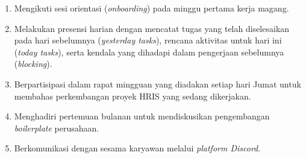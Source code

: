 \begin{enumerate}
    \item Mengikuti sesi orientasi (\textit{onboarding}) pada minggu pertama kerja magang.
    \item Melakukan presensi harian dengan mencatat tugas yang telah diselesaikan 
    pada hari sebelumnya (\textit{yesterday tasks}), rencana aktivitas untuk hari ini 
    (\textit{today tasks}), serta kendala yang dihadapi dalam pengerjaan sebelumnya (\textit{blocking}).
    \item Berpartisipasi dalam rapat mingguan yang diadakan setiap hari Jumat 
    untuk membahas perkembangan proyek HRIS yang sedang dikerjakan.
    \item Menghadiri pertemuan bulanan untuk mendiskusikan pengembangan 
    \textit{boilerplate} perusahaan.
    \item Berkomunikasi dengan sesama karyawan melalui \textit{platform Discord}.
\end{enumerate}
